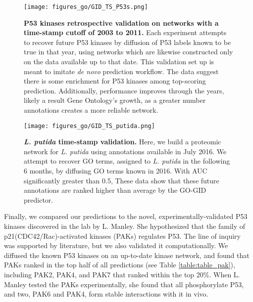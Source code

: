 \documentclass[12pt,a4paper]{report}
\begin{document}
{{\begin{figure}
\begin{minipage}[c][\textheight]{\textwidth}
\vspace*{-4in}
\centering
  \texttt{[image: figures\_go/GID\_TS\_P53s.png]}
  \caption[P53 kinases retrospective validation.]{\textbf{P53 kinases retrospective validation on networks with a time-stamp cutoff of 2003 to 2011.} Each experiment attempts to recover future P53 kinases by diffusion of P53 labels known to be true in that year, using networks which are likewise constructed only on the data available up to that date. This validation set up is meant to imitate \textit{de novo} prediction workflow. The data suggest there is some enrichment for P53 kinases among top-scoring prediction. Additionally, performance improves through the years, likely a result Gene Ontology's growth, as a greater number annotations creates a more reliable network.}
  \label{fig:go_p53_ts}
  \end{minipage}

\end{figure}

\begin{figure}
\begin{minipage}[c][\textheight]{\textwidth}
\vspace*{-4in}
\centering
  \texttt{[image: figures\_go/GID\_TS\_putida.png]}
  \caption[\textit{L. putida} time-stamp validation.]{\textbf{\textit{L. putida} time-stamp validation.} Here, we build a proteomic network for \textit{L. putida} using annotations available in July 2016. We attempt to recover GO terms, assigned to \textit{L. putida} in the following 6 months, by diffusing GO terms known in 2016. With AUC significantly greater than 0.5, These data show that these future annotations are ranked higher than average by the GO-GID predictor.}
  \label{fig:go_putida_ts}
  \end{minipage}

\end{figure}

Finally, we compared our predictions to the novel, experimentally-validated P53 kinases discovered in the lab by L. Manley. She hypothesized that the family of p21(CDC42/Rac)-activated kinases (PAKs) regulates P53. The line of inquiry was supported by literature, but we also validated it computationally. We diffused the known P53 kinases on an up-to-date kinase network, and found that PAKs ranked in the top half of all predictions (see Table \ref{table:table_pak}), including PAK2, PAK4, and PAK7 that ranked within the top 20\%. When L. Manley tested the PAKs experimentally, she found that all phosphorylate P53, and two, PAK6 and PAK4, form stable interactions with it in vivo.

}}
\end{document}

